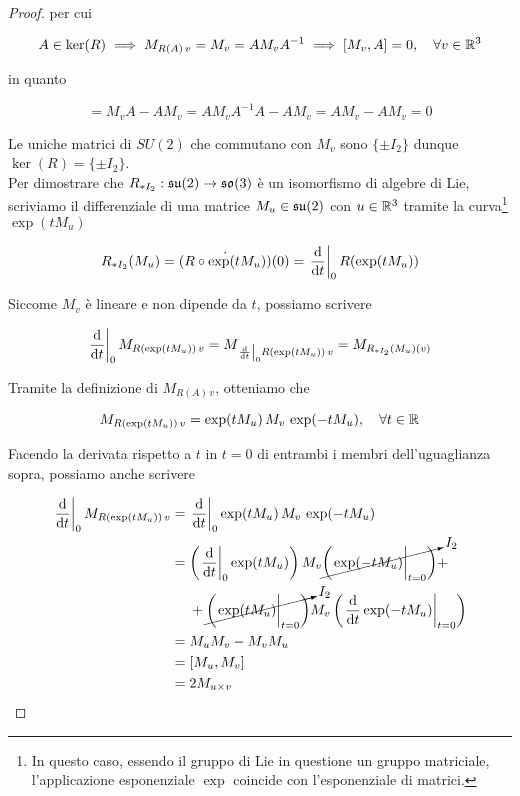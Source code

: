 \begin{proof}
	per cui
	
	\begin{equation}
		A \in \ker(R) %
		\implies %
		M_{R(A) \, v} = M_{v} = A M_{v} A^{-1} %
		\implies %
		[M_{v},A] = 0 \qcomma \forall v \in \R^{3}
	\end{equation}
	
	in quanto
	
	\begin{equation}
		[M_{v},A] = M_{v} A - A M_{v} %
		= A M_{v} A^{-1} A - A M_{v} %
		= A M_{v} - A M_{v} %
		= 0
	\end{equation}
	
	Le uniche matrici di $ SU(2) $ che commutano con $ M_{v} $ sono $ \{ \pm I_{2} \} $ dunque $ \ker(R) = \{ \pm I_{2} \} $.\\
	Per dimostrare che $ R_{*I_{2}} : \mathfrak{su}(2) \to \mathfrak{so}(3) $ è un isomorfismo di algebre di Lie, scriviamo il differenziale di una matrice $ M_{u} \in \mathfrak{su}(2) $ con $ u \in \mathbb{R}^{3} $ tramite la curva\footnote{%
		In questo caso, essendo il gruppo di Lie in questione un gruppo matriciale, l'applicazione esponenziale $ \exp $ coincide con l'esponenziale di matrici.%
	} $ \exp(t M_{u}) $
	
	\begin{equation}
		R_{*I_{2}}(M_{u}) = \dot{(R \circ \exp(t M_{u}))}(0) %
		= \eval{ \dv{t} }_{0} R( \exp(t M_{u}) )
	\end{equation}

	Siccome $ M_{v} $ è lineare e non dipende da $ t $, possiamo scrivere

	\begin{equation}
		\eval{ \dv{t} }_{0} M_{R(\exp(t M_{u})) \, v} = M_{\eval{ \dv{t} }_{0} R(\exp(t M_{u})) \, v} %
		= M_{R_{*I_{2}}(M_{u}) (v)}
	\end{equation}
	
	Tramite la definizione di $ M_{R(A) \, v} $, otteniamo che
	
	\begin{equation}
		M_{R(\exp(t M_{u})) \, v} = \exp(t M_{u}) \, M_{v} \, \exp(-t M_{u}) %
		\qcomma \forall t \in \R
	\end{equation}
	
	Facendo la derivata rispetto a $ t $ in $ t = 0 $ di entrambi i membri dell'uguaglianza sopra, possiamo anche scrivere
	
	\begin{align}
		\begin{split}
			\eval{ \dv{t} }_{0} M_{R(\exp(t M_{u})) \, v} &= \eval{ \dv{t} }_{0} \exp(t M_{u}) \, M_{v} \, \exp(-t M_{u}) \\
			&= \left( \eval{ \dv{t} }_{0} \exp(t M_{u}) \right) M_{v} \cancelto{I_{2}}{ \left( \eval{ \exp(-t M_{u}) }_{t=0} \right) } + \\
			& \hal + \cancelto{I_{2}}{ \left( \eval{ \exp(t M_{u}) }_{t=0} \right) } M_{v} \left( \eval{ \dv{t} \exp(-t M_{u}) }_{t=0} \right) \\
			&= M_{u} M_{v} - M_{v} M_{u} \\
			&= [M_{u},M_{v}] \\
			&= 2 M_{u \times v}
		\end{split}
	\end{align}
	

\end{proof}
